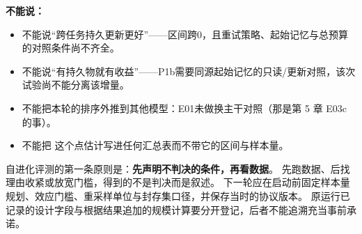 \begin{sloppypar}
\textbf{不能说：}
\end{sloppypar}
\begin{itemize}
  \item 不能说“跨任务持久更新更好”——区间跨0，且重试策略、起始记忆与总预算的对照条件尚不齐全。
  \item 不能说“有持久物就有收益”——P1b需要同源起始记忆的只读/更新对照，该次试验尚不能分离该增量。
  \item 不能把本轮的排序外推到其他模型：E01未做换主干对照（那是第 5 章 E03c 的事）。
  \item 不能把  这个点估计写进任何汇总表而不带它的区间与样本量。
\end{itemize}

\begin{principlebox}
自进化评测的第一条原则是：\textbf{先声明不判决的条件，再看数据}。
先跑数据、后找理由收紧或放宽门槛，得到的不是判决而是叙述。
下一轮应在启动前固定样本量规划、效应门槛、重采样单位与封存集口径，并保存当时的协议版本。
原运行已记录的设计字段与根据结果追加的规模计算要分开登记，后者不能追溯充当事前承诺。
\end{principlebox}



